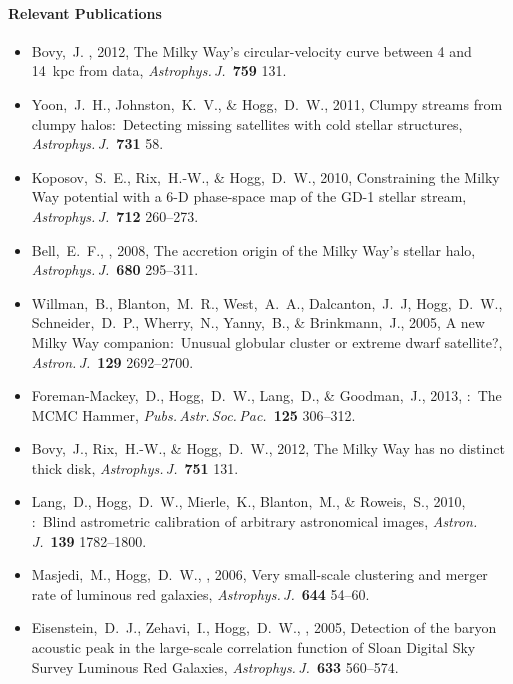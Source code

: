 \documentclass[letterpaper,12pt]{article}
\begin{document}
\paragraph{Relevant Publications}
\begin{itemize}\setlength{\itemsep}{0pt}
\item
Bovy,~J. \etal, 2012,
{The Milky Way's circular-velocity curve between 4 and 14~kpc from  data},
\textit{Astrophys.\,J.}\ \textbf{759} 131.
\item
Yoon,~J.~H., Johnston,~K.~V., \& Hogg,~D.~W., 2011,
{Clumpy streams from clumpy halos:\ Detecting missing satellites with cold stellar structures}, 
\textit{Astrophys.\,J.}\ \textbf{731} 58.
\item
Koposov,~S.~E., Rix,~H.-W., \& Hogg,~D.~W., 2010,
{Constraining the Milky Way potential with a 6-D phase-space map of the GD-1 stellar stream},
\textit{Astrophys.\,J.}\ \textbf{712} 260--273.
\item
Bell,~E.~F., \etal, 2008,
{The accretion origin of the Milky Way's stellar halo},
\textit{Astrophys.\,J.}\ \textbf{680} 295--311.
\item
Willman,~B., Blanton,~M.~R., West,~A.~A., Dalcanton,~J.~J, Hogg,~D.~W., Schneider,~D.~P., Wherry,~N., Yanny,~B., \& Brinkmann,~J., 2005,
{A new Milky Way companion:\ Unusual globular cluster or extreme dwarf satellite?},
\textit{Astron.\,J.}\ \textbf{129} 2692--2700.
\item
Foreman-Mackey,~D., Hogg,~D.~W., Lang,~D., \& Goodman,~J., 2013,
{:\ The MCMC Hammer},
\textit{Pubs.\,Astr.\,Soc.\,Pac.}\ \textbf{125} 306--312.
\item
Bovy,~J., Rix,~H.-W., \& Hogg,~D.~W., 2012,
{The Milky Way has no distinct thick disk},
\textit{Astrophys.\,J.}\ \textbf{751} 131.
\item
Lang,~D., Hogg,~D.~W., Mierle,~K., Blanton,~M., \& Roweis,~S., 2010,
{:\ Blind astrometric calibration of arbitrary astronomical images},
\textit{Astron.\,J.}\ \textbf{139} 1782--1800.
\item
Masjedi,~M., Hogg,~D.~W., \etal, 2006,
{Very small-scale clustering and merger rate of luminous red galaxies},
\textit{Astrophys.\,J.}\ \textbf{644} 54--60.
\item
Eisenstein,~D.~J., Zehavi,~I., Hogg,~D.~W., \etal, 2005,
Detection of the baryon acoustic peak in the large-scale correlation
function of Sloan Digital Sky Survey Luminous Red Galaxies,
\textit{Astrophys.\,J.}\ \textbf{633} 560--574.
\end{itemize}
\end{document}
